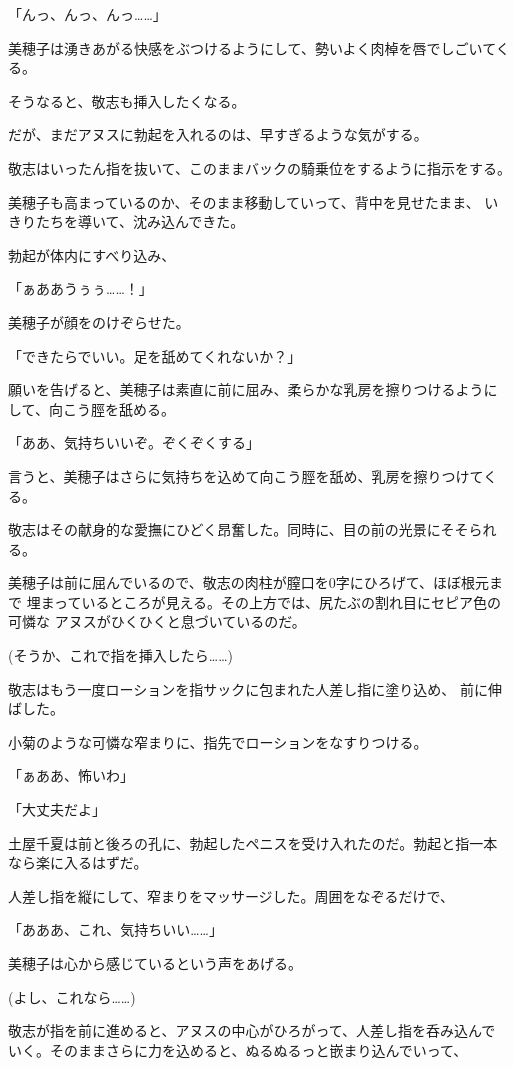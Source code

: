 ﻿\documentclass[
    book,tate,
    line_length=30zw,
    jafontsize=12pt,
    paper=b5j,
    landscape,
    ]{jlreq}
\begin{document}
「んっ、んっ、んっ……」

美穂子は湧きあがる快感をぶつけるようにして、勢いよく肉棹を唇でしごいてくる。

そうなると、敬志も挿入したくなる。

だが、まだアヌスに勃起を入れるのは、早すぎるような気がする。

敬志はいったん指を抜いて、このままバックの騎乗位をするように指示をする。

美穂子も高まっているのか、そのまま移動していって、背中を見せたまま、
いきりたちを導いて、沈み込んできた。

勃起が体内にすべり込み、

「ぁああうぅぅ……！」

美穂子が顔をのけぞらせた。

「できたらでいい。足を舐めてくれないか？」

願いを告げると、美穂子は素直に前に屈み、柔らかな乳房を擦りつけるように
して、向こう脛を舐める。

「ああ、気持ちいいぞ。ぞくぞくする」

言うと、美穂子はさらに気持ちを込めて向こう脛を舐め、乳房を擦りつけてくる。

敬志はその献身的な愛撫にひどく昂奮した。同時に、目の前の光景にそそられる。

美穂子は前に屈んでいるので、敬志の肉柱が膣口を0字にひろげて、ほぼ根元まで
埋まっているところが見える。その上方では、尻たぶの割れ目にセピア色の可憐な
アヌスがひくひくと息づいているのだ。

(そうか、これで指を挿入したら……)

敬志はもう一度ローションを指サックに包まれた人差し指に塗り込め、
前に伸ばした。

小菊のような可憐な窄まりに、指先でローションをなすりつける。

「ぁああ、怖いわ」

「大丈夫だよ」

土屋千夏は前と後ろの孔に、勃起したペニスを受け入れたのだ。勃起と指一本
なら楽に入るはずだ。

人差し指を縦にして、窄まりをマッサージした。周囲をなぞるだけで、

「あああ、これ、気持ちいい……」

美穂子は心から感じているという声をあげる。

(よし、これなら……)

敬志が指を前に進めると、アヌスの中心がひろがって、人差し指を呑み込んで
いく。そのままさらに力を込めると、ぬるぬるっと嵌まり込んでいって、
\end{document}
